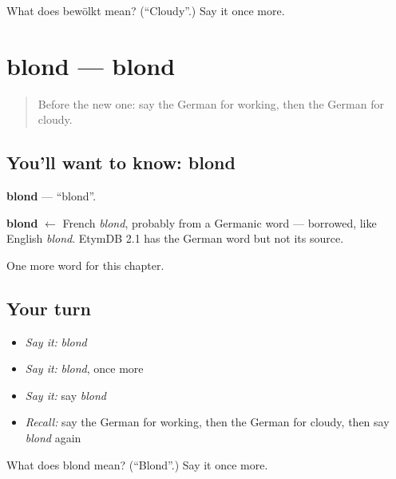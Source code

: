 \begin{tcolorbox}[breakable,colback=teal!4,colframe=teal!35!black,title={Before you move on}]
What does bewölkt mean? (\textquotedblleft{}Cloudy\textquotedblright{}.) Say it once more.
\end{tcolorbox}
\section[blond]{blond — blond}

\label{lesson:GE-C212-blond}



\begin{quote}
Before the new one: say the German for working, then the German for cloudy.
\end{quote}

\subsection*{You'll want to know: blond}
\textbf{blond} — \textquotedblleft{}blond\textquotedblright{}.

\begin{cousinweb}
\textbf{blond} $\leftarrow$ French \emph{blond}, probably from a Germanic word — borrowed, like English \emph{blond}. EtymDB 2.1 has the German word but not its source.
\end{cousinweb}

\begin{grammarlens}[title={What you've built}]
One more word for this chapter.
\end{grammarlens}

\subsection*{Your turn}
\begin{itemize}
\raggedright
  \item \emph{Say it:} \emph{blond}
  \item \emph{Say it:} \emph{blond}, once more
  \item \emph{Say it:} say \emph{blond}
  \item \emph{Recall:} say the German for working, then the German for cloudy, then say \emph{blond} again
\end{itemize}

\begin{tcolorbox}[breakable,colback=teal!4,colframe=teal!35!black,title={Before you move on}]
What does blond mean? (\textquotedblleft{}Blond\textquotedblright{}.) Say it once more.
\end{tcolorbox}
